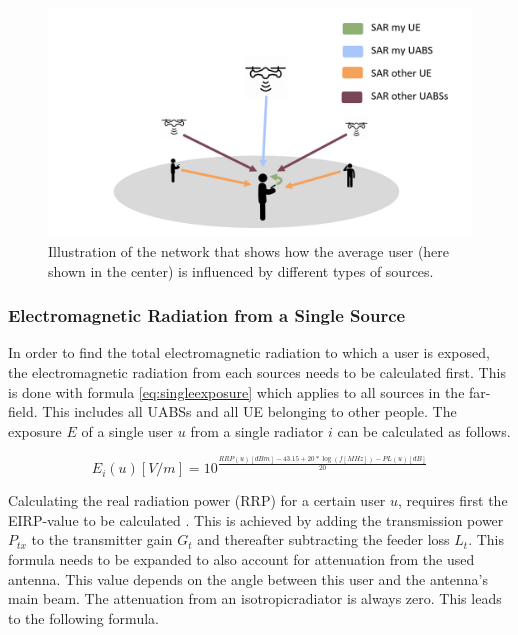 \documentclass[twocolumn]{phdsymp} %
\begin{document}
\begin{figure}[h!]
\centering
  \includegraphics[width=\linewidth]{networkIllustrationSARSources.png}
  \caption{Illustration of the network that shows how the average user (here shown in the center) is influenced by different types of sources. }
  \label{fig:networkIllustration}
\end{figure}

\subsubsection{Electromagnetic Radiation from a Single Source}
\label{sec:calculatingexposure}

In order to find the total electromagnetic radiation to which a user is exposed, 
the electromagnetic radiation from each sources needs to be calculated first.
This is done with formula \ref{eq:singleexposure} which applies to all sources in the far-field.
This includes all \gls{UABS}s and all \gls{UE}  belonging to other people.
The exposure $E$ of a single user $u$ from a single radiator $i$ can be calculated
as follows.

\begin{equation}
E_i(u) [V/m] = 10^{\frac{RRP(u)[dBm] - 43.15 + 20*\log(f [MHz])- PL(u) [dB]}{20}}
\label{eq:singleexposure}
\end{equation}

Calculating the real radiation power (RRP) for a certain user $u$, requires first the \gls{EIRP}-value to be calculated  \cite{J6_originalExposureFormula,J1}.
This is achieved by adding the transmission power $P_{tx}$ to the transmitter gain $G_t$ and thereafter subtracting the feeder loss $L_t$.
This formula needs to be expanded to also account for attenuation from the used antenna. This value depends on the angle
between this user and the antenna's main beam. The attenuation from an \gls{isotropicradiator} is always zero. This leads to the following formula.
\end{document}
